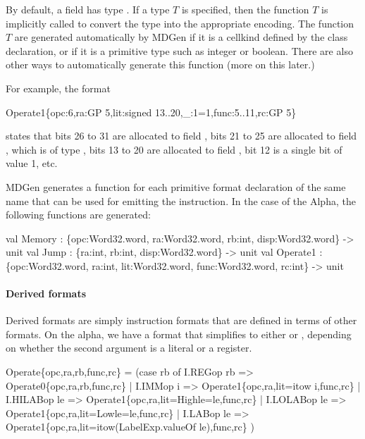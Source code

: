   By default, a field has type .  If a type $T$ 
is specified, then the function $T$ is implicitly called
to convert the type into the appropriate encoding.   The function 
$T$ are generated automatically by MDGen if it is a cellkind
defined by the  class declaration, or if it is a primitive
type such as integer or boolean.  
There are also other ways to automatically generate this function
(more on this later.)

  For example, the format 
\begin{SML}
   Operate1\{opc:6,ra:GP 5,lit:signed 13..20,_:1=1,func:5..11,rc:GP 5\} 
\end{SML}
states that bits 26 to 31 are allocated to field , 
bits 21 to 25 are allocated to field , which is of type 
, bits 13 to 20 are allocated to field , bit 12
is a single bit of value 1, etc.


MDGen generates a function for each primitive format declaration of
the same name that can be used for emitting the instruction.  
In the case of the Alpha, the following functions are generated:
\begin{SML}
   val Memory : \{opc:Word32.word, ra:Word32.word, 
                 rb:int, disp:Word32.word\} -> unit
   val Jump   : \{ra:int, rb:int, disp:Word32.word\} -> unit
   val Operate1 : \{opc:Word32.word, ra:int, lit:Word32.word,
                   func:Word32.word, rc:int\} -> unit
\end{SML}

\paragraph{Derived formats}

   Derived formats are simply instruction formats that are defined
in terms of other formats.  On the alpha, we have a 
format that simplifies to either  or ,
depending on whether the second argument is a literal or a register.  
\begin{SML}
   Operate\{opc,ra,rb,func,rc\} =
     (case rb of
       I.REGop rb => Operate0\{opc,ra,rb,func,rc\}
     | I.IMMop i  => Operate1\{opc,ra,lit=itow i,func,rc\}
     | I.HILABop le => Operate1\{opc,ra,lit=High{le=le},func,rc\}
     | I.LOLABop le => Operate1\{opc,ra,lit=Low{le=le},func,rc\}
     | I.LABop le => Operate1\{opc,ra,lit=itow(LabelExp.valueOf le),func,rc\}
     )
\end{SML}

